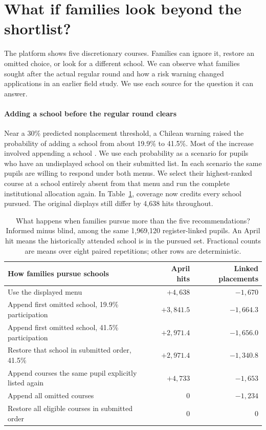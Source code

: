 \section{What if families look beyond the shortlist?}\label{sec:response}
The platform shows five discretionary courses. Families can ignore it, restore an omitted choice, or look for a different school. We can observe what families sought after the actual regular round and how a risk warning changed applications in an earlier field study. We use each source for the question it can answer.

\paragraph{Adding a school before the regular round clears}
Near a 30\% predicted nonplacement threshold, a Chilean warning raised the probability of adding a school from about 19.9\% to 41.5\%. Most of the increase involved appending a school \citep{smartplatforms,warningdata}. We use each probability as a scenario for pupils who have an undisplayed school on their submitted list. In each scenario the same pupils are willing to respond under both menus. We select their highest-ranked course at a school entirely absent from that menu and run the complete institutional allocation again. In Table~\ref{tab:behavior-main}, coverage now credits every school pursued. The original displays still differ by 4,638 hits throughout.

\begin{table}[ht]\centering\small
\caption{What happens when families pursue more than the five recommendations? Informed minus blind, among the same 1,969,120 register-linked pupils. An April hit means the historically attended school is in the pursued set. Fractional counts are means over eight paired repetitions; other rows are deterministic.}\label{tab:behavior-main}
\begin{tabular}{@{}lrr@{}}\toprule
How families pursue schools & April hits & Linked placements\\\midrule
Use the displayed menu & $+4,638$ & $-1,670$\\
Append first omitted school, 19.9\% participation & $+3,841.5$ & $-1,664.3$\\
Append first omitted school, 41.5\% participation & $+2,971.4$ & $-1,656.0$\\
Restore that school in submitted order, 41.5\% & $+2,971.4$ & $-1,340.8$\\
Append courses the same pupil explicitly listed again & $+4,733$ & $-1,653$\\
Append all omitted courses & $0$ & $-1,234$\\
Restore all eligible courses in submitted order & $0$ & $0$\\\bottomrule
\end{tabular}
\end{table}

